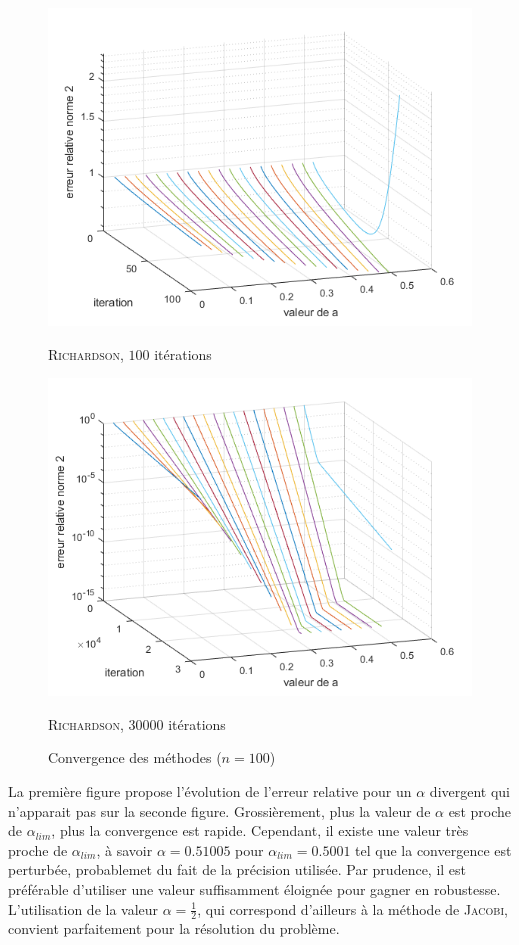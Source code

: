 \documentclass[12pt]{report}
\begin{document}
\begin{figure}[H]
\begin{minipage}{0.5\textwidth}
\includegraphics[scale = 0.63]{j_i_a_2_100.png}
\caption{\textsc{Richardson}, $100$ itérations}
\end{minipage}
\begin{minipage}{0.499\textwidth}
\includegraphics[scale = 0.63]{j_i_a_2_30000.png}
\caption{ \textsc{Richardson}, $30000$ itérations }
\end{minipage}
\caption{Convergence des méthodes  ($n = 100$)}
\end{figure}


La première figure propose l'évolution de l'erreur relative pour un $\alpha$ divergent qui n'apparait pas sur la seconde figure. Grossièrement, plus la valeur de $\alpha$ est proche de $\alpha_{lim}$, plus la convergence est rapide.  Cependant, il existe une valeur très proche de $\alpha_{lim}$, à savoir $\alpha =  0.51005$ pour $\alpha_{lim} = 0.5001$ tel que la convergence est perturbée, probablemet du fait de la précision utilisée. Par prudence, il est préférable d'utiliser une valeur suffisamment éloignée pour gagner en robustesse. L'utilisation de la valeur $\alpha = \frac{1}{2}$, qui correspond d'ailleurs à la méthode de \textsc{Jacobi}, convient parfaitement pour la résolution du problème.
\end{document}
